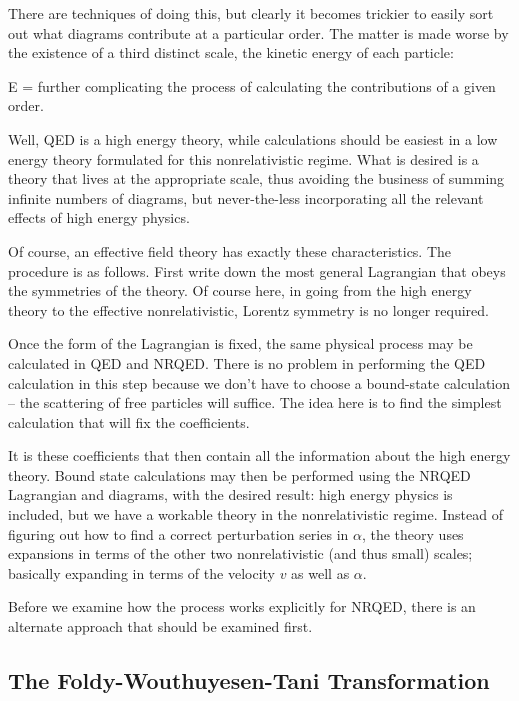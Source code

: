 There are techniques of doing this, but clearly it becomes trickier to easily sort out what diagrams contribute at a particular order.  The matter is made worse by the existence of a third distinct scale, the kinetic energy of each particle: 

\beq  E =  \eeq
further complicating the process of calculating the contributions of a given order.

Well, QED is a high energy theory, while calculations should be easiest in a low energy theory formulated for this nonrelativistic regime.  What is desired is a theory that lives at the appropriate scale, thus avoiding the business of summing infinite numbers of diagrams, but never-the-less incorporating all the relevant effects of high energy physics.

Of course, an effective field theory has exactly these characteristics.  The procedure is as follows.  First write down the most general Lagrangian that obeys the symmetries of the theory.  Of course here, in going from the high energy theory to the effective nonrelativistic, Lorentz symmetry is no longer required.  

Once the form of the Lagrangian is fixed, the same physical process may be calculated in QED and NRQED.  There is no problem in performing the QED calculation in this step because we don't have to choose a bound-state calculation -- the scattering of free particles will suffice.  The idea here is to find the simplest calculation that will fix the coefficients.

It is these coefficients that then contain all the information about the high energy theory.  Bound state calculations may then be performed using the NRQED Lagrangian and diagrams, with the desired result: high energy physics is included, but we have a workable theory in the nonrelativistic regime.  Instead of figuring out how to find a correct perturbation series in $\alpha$, the theory uses expansions in terms of the other two nonrelativistic (and thus small) scales; basically expanding in terms of the velocity $v$ as well as $\alpha$.

Before we examine how the process works explicitly for NRQED, there is an alternate approach that should be examined first.

\subsection{The Foldy-Wouthuyesen-Tani Transformation}


